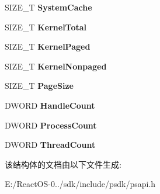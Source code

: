 \begin{DoxyCompactItemize}
\mbox{\label{struct___p_e_r_f_o_r_m_a_n_c_e___i_n_f_o_r_m_a_t_i_o_n_af2f0c3908728098f0aba5806d734dd64}} 
S\+I\+Z\+E\+\_\+T {\bfseries System\+Cache}
\item 
\mbox{\label{struct___p_e_r_f_o_r_m_a_n_c_e___i_n_f_o_r_m_a_t_i_o_n_a62eea23289bf40aa1d432576da520b05}} 
S\+I\+Z\+E\+\_\+T {\bfseries Kernel\+Total}
\item 
\mbox{\label{struct___p_e_r_f_o_r_m_a_n_c_e___i_n_f_o_r_m_a_t_i_o_n_ad70572b7bee3cbdf6cca41cf728f214f}} 
S\+I\+Z\+E\+\_\+T {\bfseries Kernel\+Paged}
\item 
\mbox{\label{struct___p_e_r_f_o_r_m_a_n_c_e___i_n_f_o_r_m_a_t_i_o_n_a3564e84bf8fef35fb3cede35a0768e03}} 
S\+I\+Z\+E\+\_\+T {\bfseries Kernel\+Nonpaged}
\item 
\mbox{\label{struct___p_e_r_f_o_r_m_a_n_c_e___i_n_f_o_r_m_a_t_i_o_n_a8b6f51cc779e4f859f6f461a483fd80e}} 
S\+I\+Z\+E\+\_\+T {\bfseries Page\+Size}
\item 
\mbox{\label{struct___p_e_r_f_o_r_m_a_n_c_e___i_n_f_o_r_m_a_t_i_o_n_a509090f72e7d08aaa5a3d4fd1692eb14}} 
D\+W\+O\+RD {\bfseries Handle\+Count}
\item 
\mbox{\label{struct___p_e_r_f_o_r_m_a_n_c_e___i_n_f_o_r_m_a_t_i_o_n_adb8f6afea803d1804e9524a565513aac}} 
D\+W\+O\+RD {\bfseries Process\+Count}
\item 
\mbox{\label{struct___p_e_r_f_o_r_m_a_n_c_e___i_n_f_o_r_m_a_t_i_o_n_a6d8be300f3b80cf9dd5b77f7bddd5b77}} 
D\+W\+O\+RD {\bfseries Thread\+Count}
\end{DoxyCompactItemize}


该结构体的文档由以下文件生成\+:\begin{DoxyCompactItemize}
\item 
E\+:/\+React\+O\+S-\/0../sdk/include/psdk/psapi.\+h\end{DoxyCompactItemize}
